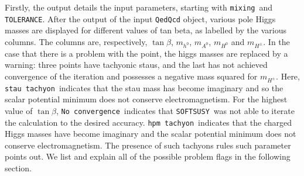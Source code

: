 \documentclass{article}
\def\SOFTSUSY{{\tt SOFTSUSY}}
\def\code#1{\small{\tt #1}\normalsize}
\begin{document}
Firstly, the output details the input parameters, starting with
\code{mixing}~and \code{TOLERANCE}.  
After the output of the input \code{QedQcd} object,
various pole Higgs masses are displayed for different values of tan beta, as
labelled by the various columns. The columns are, respectively, 
$\tan \beta$, $m_{h^0}$, $m_{A^0}$, $m_{H^0}$ and $m_{H^\pm}$.
In the case that there is a problem with the point, the higgs masses are
replaced by a warning: three points have tachyonic staus, and the last has
not achieved convergence of the iteration and possesses a negative mass
squared for $m_{H^\pm}$. Here, \code{stau tachyon}~indicates that the
stau mass has become imaginary and so the scalar potential minimum does not 
conserve electromagnetism. For the highest value of $\tan \beta$, \code{No
  convergence}~indicates that \SOFTSUSY~was not able to iterate the
calculation to the desired accuracy. \code{hpm tachyon}~indicates that the
charged Higgs masses have become imaginary and the scalar potential minimum
does not conserve electromagnetism. The presence of such tachyons rules such
parameter points out.  
We list and explain all of the possible problem flags in 
the following section.
\end{document}
